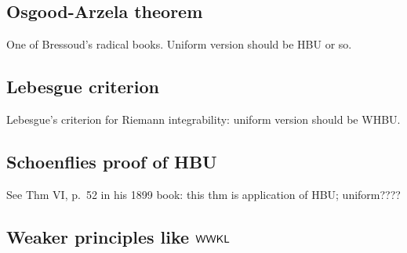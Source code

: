 \documentclass[reqno]{amsart}
\def\WWKL{\textup{\textsf{WWKL}}}
\numberwithin{equation}{section}
\numberwithin{thm}{section}
\begin{document}
\subsection{Osgood-Arzela theorem}
One of Bressoud's radical books.  Uniform version should be HBU or so.  



\subsection{Lebesgue criterion}
Lebesgue's criterion for Riemann integrability: uniform version should be WHBU.  


\subsection{Schoenflies proof of HBU}
See Thm VI, p.\ 52 in his 1899 book: this thm is application of HBU; uniform????



\subsection{Weaker principles like $\WWKL$}
\end{document}
